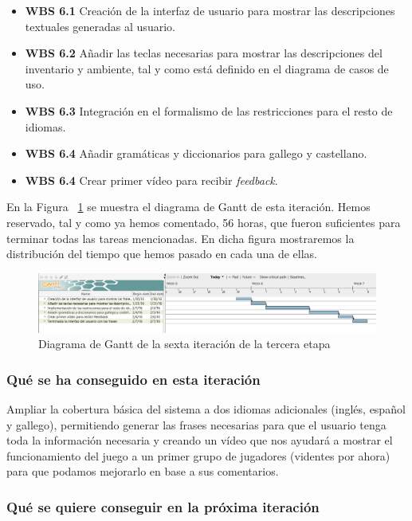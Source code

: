 \begin{itemize}
  \item \textbf{WBS 6.1} Creación de la interfaz de usuario para mostrar las descripciones textuales generadas al usuario.
  \item \textbf{WBS 6.2} Añadir las teclas necesarias para mostrar las descripciones del inventario y ambiente, tal y como está definido en el diagrama de casos de uso.
  \item \textbf{WBS 6.3} Integración en el formalismo de las restricciones para el resto de idiomas.
  \item \textbf{WBS 6.4} Añadir gramáticas y diccionarios para gallego y castellano.
  \item \textbf{WBS 6.4} Crear primer vídeo para recibir \textit{feedback}.
\end{itemize}

\noindent En la Figura ~\ref{fig:sec3it6} se muestra el diagrama de Gantt de esta iteración. Hemos reservado, tal y como ya hemos comentado, 56 horas, que fueron suficientes para terminar todas las tareas mencionadas. En dicha figura mostraremos la distribución del tiempo que hemos pasado en cada una de ellas.

\begin{figure}
    \includegraphics[width=\textwidth,height=\textheight,keepaspectratio]{./img/sec3it6.png}
  \caption{Diagrama de Gantt de la sexta iteración de la tercera etapa}
  \label{fig:sec3it6}
\end{figure}

\subsubsection{Qué se ha conseguido en esta iteración}

Ampliar la cobertura básica del sistema a dos idiomas adicionales (inglés, español y gallego), permitiendo generar las frases necesarias para que el usuario tenga toda la información necesaria y creando un vídeo que nos ayudará a mostrar el funcionamiento del juego a un primer grupo de jugadores (videntes por ahora) para que podamos mejorarlo en base a sus comentarios.

\subsubsection{Qué se quiere conseguir en la próxima iteración}

